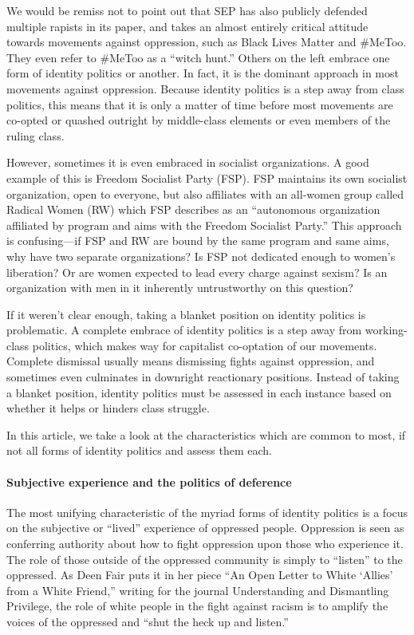 We would be remiss not to point out that SEP has also publicly defended multiple rapists in its paper, and takes an almost entirely critical attitude towards movements against oppression, such as Black Lives Matter and \#MeToo. They even refer to \#MeToo as a ``witch hunt.'' Others on the left embrace one form of identity politics or another. In fact, it is the dominant approach in most movements against oppression. Because identity politics is a step away from class politics, this means that it is only a matter of time before most movements are co-opted or quashed outright by middle-class elements or even members of the ruling class.

However, sometimes it is even embraced in socialist organizations. A good example of this is Freedom Socialist Party (FSP). FSP maintains its own socialist organization, open to everyone, but also affiliates with an all-women group called Radical Women (RW) which FSP describes as an ``autonomous organization affiliated by program and aims with the Freedom Socialist Party.'' This approach is confusing---if FSP and RW are bound by the same program and same aims, why have two separate organizations? Is FSP not dedicated enough to women's liberation? Or are women expected to lead every charge against sexism? Is an organization with men in it inherently untrustworthy on this question?

If it weren't clear enough, taking a blanket position on identity politics is problematic. A complete embrace of identity politics is a step away from working-class politics, which makes way for capitalist co-optation of our movements. Complete dismissal usually means dismissing fights against oppression, and sometimes even culminates in downright reactionary positions. Instead of taking a blanket position, identity politics must be assessed in each instance based on whether it helps or hinders class struggle.

In this article, we take a look at the characteristics which are common to most, if not all forms of identity politics and assess them each.

\paragraph{Subjective experience and the politics of deference}

The most unifying characteristic of the myriad forms of identity politics is a focus on the subjective or ``lived'' experience of oppressed people. Oppression is seen as conferring authority about how to fight oppression upon those who experience it. The role of those outside of the oppressed community is simply to ``listen'' to the oppressed. As Deen Fair puts it in her piece ``An Open Letter to White `Allies' from a White Friend,'' writing for the journal Understanding and Dismantling Privilege, the role of white people in the fight against racism is to amplify the voices of the oppressed and ``shut the heck up and listen.''

